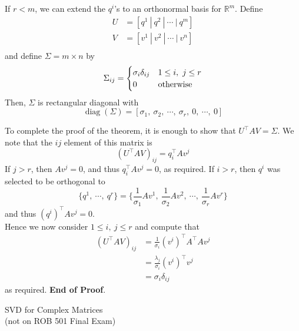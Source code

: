 \documentclass[letterpaper]{article}
\newcommand{\real}{\mathbb R}  %
\begin{document}
    If $r<m$, we can extend the $q^i$'s to an orthonormal basis for $\real^m$. Define
    \begin{align*}
        U &= [q^1\ |\ q^2\ |\ \cdots\ |\ q^m]\\
        V &= [v^1\ |\ v^2\ |\ \cdots\ |\ v^n]\\
    \end{align*}
and define $\Sigma=m\times n$ by
    \begin{equation*}
        \Sigma_{ij} = \begin{cases}
                \sigma_i\delta_{ij} & 1\leq i,\ j\leq r\\
                0 & \textnormal{otherwise}
            \end{cases}
    \end{equation*}
    Then, $\Sigma$ is rectangular diagonal with
    \begin{equation*}
        \operatorname{diag}\left(\Sigma\right)=[\sigma_1,\ \sigma_2,\ \cdots,\ \sigma_r,\ 0,\ \cdots,\ 0]
    \end{equation*}

   To complete the proof of the theorem, it is enough to show that $ U^\top AV = \Sigma$. We note that the $ij$ element of this matrix is
$$        (U^\top AV)_{ij} = q_i^\top Av^j
$$
    If $j>r$, then $Av^j=0$, and thus $q_i^\top Av^j=0$, as required. If $i>r$, then $q^i$ was selected to be orthogonal to
    \begin{equation*}
        \{q^1,\ \cdots,\ q^r\}=\{\frac{1}{\sigma_1}Av^1,\ \frac{1}{\sigma_2}Av^2,\ \cdots,\ \frac{1}{\sigma_r}Av^r\}
    \end{equation*}
    and thus $\left(q^i\right)^\top Av^j=0$.\\

   Hence we now consider $1\leq i,\ j\leq r$ and compute that
    \begin{align*}
        \left(U^\top AV\right)_{ij} &= \frac{1}{\sigma_i}\left(v^i\right)^\top A^\top Av^j\\
        &= \frac{\lambda_j}{\sigma_i}\left(v^i\right)^\top v^j\\
        &= \sigma_i\delta_{ij}
    \end{align*}
    as required. \textbf{End of Proof}.

 \newpage

 {\Large \bf
\begin{center}
SVD for Complex Matrices\\
(not on ROB 501 Final Exam)
\end{center}
}
\end{document}
